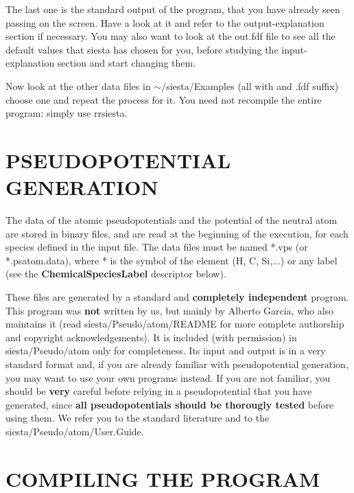 The last one is the standard output of the program, that you
have already seen passing on the screen. Have a look at it
and refer to the output-explanation section if necessary.
You may also want to look at the out.fdf file to see all
the default values that siesta has chosen for you, before
studying the input-explanation section and start changing them.

Now look at the other data files in $\sim$/siesta/Examples
(all with and .fdf suffix) choose one and repeat the process for it.
You need not recompile the entire program: simply use rrsiesta.



\section{PSEUDOPOTENTIAL GENERATION}

The data of the atomic pseudopotentials and the potential
of the neutral atom are stored in binary files, and
are read at the beginning of the execution, for each
species defined in the input file. The data files must
be named *.vps (or *.psatom.data), where * is the symbol of the
element (H, C, Si,...) or any label (see the {\bf ChemicalSpeciesLabel}
descriptor below).

These files are generated by a standard and {\bf completely independent}
program. This program was {\bf not} written by us, but mainly by 
Alberto Garcia, who also maintains it
(read siesta/Pseudo/atom/README for more complete authorship and 
copyright acknowledgements).
It is included (with permission) in siesta/Pseudo/atom only for
completeness. Its input and output is in a very standard format and,
if you are already familiar with pseudopotential generation, you may want 
to use your own programs instead. If you are not familiar, you should
be {\bf very} careful before relying in a pseudopotential that you
have generated, since {\bf all pseudopotentials should be thorougly
tested} before using them. We refer you to the standard literature
and to the siesta/Pseudo/atom/User.Guide.



%



\section{COMPILING THE PROGRAM}

